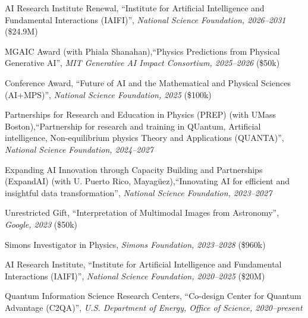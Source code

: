 \bbl
\item AI Research Institute Renewal, ``Institute for Artificial Intelligence and Fundamental Interactions (IAIFI)'', \textit{National Science Foundation, 2026--2031}
(\$24.9M)
\item MGAIC Award (with Phiala Shanahan),``Physics Predictions from Physical Generative AI'', \textit{MIT Generative AI Impact Consortium, 2025--2026}
(\$50k)
\item Conference Award, ``Future of AI and the Mathematical and Physical Sciences (AI+MPS)'', \textit{National Science Foundation, 2025}
(\$100k)
\item Partnerships for Research and Education in Physics (PREP) (with UMass Boston),``Partnership for research and training in QUantum, Artificial intelligence, Non-equilibrium physics Theory and Applications (QUANTA)'', \textit{National Science Foundation, 2024--2027}

\item Expanding AI Innovation through Capacity Building and Partnerships (ExpandAI) (with U. Puerto Rico, Mayagüez),``Innovating AI for efficient and insightful data transformation'', \textit{National Science Foundation, 2023--2027}

\item Unrestricted Gift, ``Interpretation of Multimodal Images from Astronomy'', \textit{Google, 2023}
(\$50k)
\item Simons Investigator in Physics, \textit{Simons Foundation, 2023--2028}
(\$960k)
\item AI Research Institute, ``Institute for Artificial Intelligence and Fundamental Interactions (IAIFI)'', \textit{National Science Foundation, 2020--2025}
(\$20M)
\item Quantum Information Science Research Centers, ``Co-design Center for Quantum Advantage (C2QA)'', \textit{U.S. Department of Energy, Office of Science, 2020--present}

